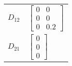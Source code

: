 \begin{tabular}{cl}
 $D_{12}$ & $\left[\begin{matrix}0 & 0\\0 & 0\\0 & 0.2\end{matrix}\right]$                                                                                   \\
 $D_{21}$ & $\left[\begin{matrix}0\\0\\0\end{matrix}\right]$                                                                                                 \\
\hline
\end{tabular}